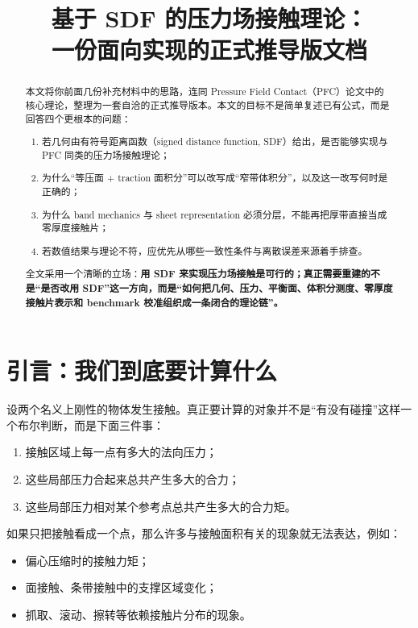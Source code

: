\documentclass[12pt,a4paper]{ctexart}
\title{基于 SDF 的压力场接触理论：\\
一份面向实现的正式推导版文档}
\author{}
\date{}
\begin{document}
\maketitle

\begin{abstract}
本文将你前面几份补充材料中的思路，连同 Pressure Field Contact（PFC）论文中的核心理论，整理为一套自洽的正式推导版本。本文的目标不是简单复述已有公式，而是回答四个更根本的问题：
\begin{enumerate}
    \item 若几何由有符号距离函数（signed distance function, SDF）给出，是否能够实现与 PFC 同类的压力场接触理论；
    \item 为什么“等压面 + traction 面积分”可以改写成“窄带体积分”，以及这一改写何时是正确的；
    \item 为什么 band mechanics 与 sheet representation 必须分层，不能再把厚带直接当成零厚度接触片；
    \item 若数值结果与理论不符，应优先从哪些一致性条件与离散误差来源着手排查。
\end{enumerate}

全文采用一个清晰的立场：\textbf{用 SDF 来实现压力场接触是可行的；真正需要重建的不是“是否改用 SDF”这一方向，而是“如何把几何、压力、平衡面、体积分测度、零厚度接触片表示和 benchmark 校准组织成一条闭合的理论链”。}
\end{abstract}

\tableofcontents

\section{引言：我们到底要计算什么}

设两个名义上刚性的物体发生接触。真正要计算的对象并不是“有没有碰撞”这样一个布尔判断，而是下面三件事：
\begin{enumerate}
    \item 接触区域上每一点有多大的法向压力；
    \item 这些局部压力合起来总共产生多大的合力；
    \item 这些局部压力相对某个参考点总共产生多大的合力矩。
\end{enumerate}

如果只把接触看成一个点，那么许多与接触面积有关的现象就无法表达，例如：
\begin{itemize}
    \item 偏心压缩时的接触力矩；
    \item 面接触、条带接触中的支撑区域变化；
    \item 抓取、滚动、擦转等依赖接触片分布的现象。
\end{itemize}
\end{document}
